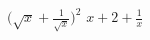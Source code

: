 {$\displaystyle \Bigg( \sqrt{x} + \frac{1}{\sqrt{x}} \Bigg)^2$}
{$\displaystyle x + 2 + \frac{1}{x}$}
